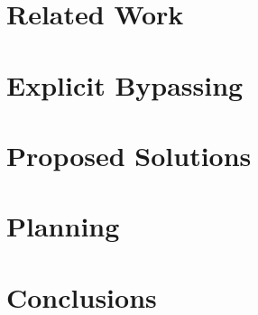 \documentclass[a4paper,10pt,twoside]{report}
\begin{document}

%


%


\chapter{Related Work}\label{chapter:related_work}



\chapter{Explicit Bypassing}\label{chapter:explicit_bypassing}



\chapter{Proposed Solutions}\label{chapter:solutions}



\chapter{Planning}\label{chapter:planning}



\chapter{Conclusions}\label{chapter:conclusions}




%



\appendix
{}


\end{document}
